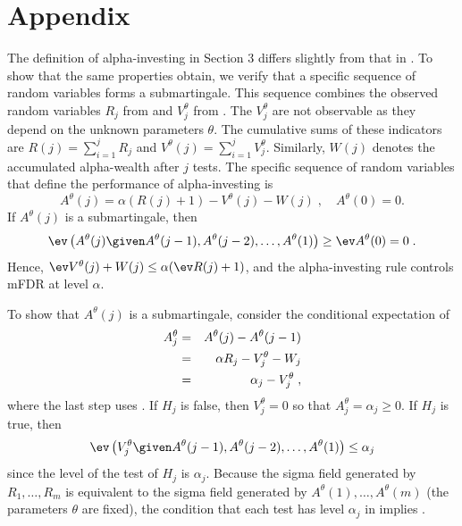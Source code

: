 \documentclass[12pt]{article}
\begin{document}




\section*{Appendix} 

 The definition of alpha-investing in Section 3 differs slightly from that in
 \citet{fosterstine08}.  To show that the same properties obtain, we
 verify that a specific sequence of random variables forms a submartingale.
  This sequence combines the observed random variables $R_j$ from 
 and $V^\theta_j$ from .  The $V^\theta_j$ are not observable as they
 depend on the unknown parameters $\theta$.  The cumulative sums of these
 indicators are $ R(j) = \sum_{i=1}^j R_j$ and $V^\theta(j) = \sum_{i=1}^j
 V^\theta_j$.  Similarly, $W(j)$ denotes the accumulated alpha-wealth after $j$
 tests.  The specific sequence of random variables that define the performance
 of alpha-investing is
\begin{equation}
  A^\theta(j) = \alpha(R(j) + 1) - V^\theta(j) - W(j) \;, \quad A^\theta(0) = 0.
\label{eq:Aofj}
\end{equation}
 If $A^\theta(j)$ is a submartingale, then
\begin{equation}
   \ev \left(A^\theta(j) \given A^\theta(j-1), A^\theta(j-2), \ldots,
     A^\theta(1)\right)  \ge \ev A^\theta(0) = 0\;.
\label{eq:sub}
\end{equation}
 Hence, $\ev V^\theta(j) + W(j) \le \alpha(\ev R(j) + 1)$, and the
 alpha-investing rule controls mFDR at level $\alpha$.

 
 To show that $A^\theta(j)$ is a submartingale, consider the conditional expectation of
\begin{eqnarray}
  A^\theta_j &=& A^\theta(j) - A^\theta(j-1) \cr
      &=& \alpha R_j - V^\theta_j - W_j \cr
      &=& \alpha_j - V^\theta_j \;,
\label{eq:Aj}
\end{eqnarray}
 where the last step uses .  If $H_j$ is false, then $V^\theta_j=0$
 so that $A^\theta_j = \alpha_j \ge 0$.  If $H_j$ is true, then
\begin{equation}
  \ev \left(V^\theta_j \given  
  A^\theta(j-1), A^\theta(j-2), \ldots, A^\theta(1)\right) 
  \le \alpha_j
\label{eq:condexp}
\end{equation}
 since the level of the test of $H_j$ is $\alpha_j$.  Because the sigma field
 generated by $R_1,\ldots,R_m$ is equivalent to the sigma field generated by
 $A^\theta(1), \ldots, A^\theta(m)$ (the parameters $\theta$ are fixed), the
 condition that each test has level $\alpha_j$ in  implies
 .
 
\end{document}
